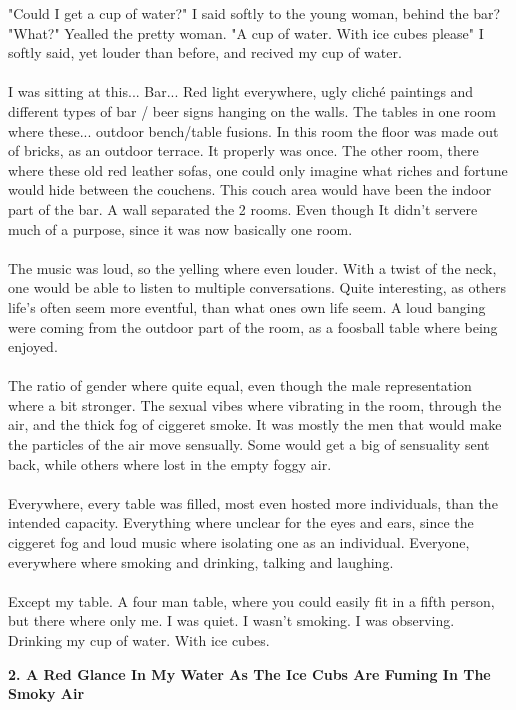 \documentclass[]{article}
\begin{document}
"Could I get a cup of water?" I said softly to the young woman, behind the bar?
"What?" Yealled the pretty woman.
"A cup of water. With ice cubes please" I softly said, yet louder than before, and recived my cup of water.
\\ \\
I was sitting at this... Bar... Red light everywhere, ugly cliché paintings and different types of bar / beer signs hanging on the walls. The tables in one room where these... outdoor bench/table fusions. In this room the floor was made out of bricks, as an outdoor terrace. It properly was once. The other room, there where these old red leather sofas, one could only imagine what riches and fortune would hide between the couchens. This couch area would have been the indoor part of the bar. A wall separated the 2 rooms. Even though It didn't  servere much of a purpose, since it was now basically one room.
\\ \\
The music was loud, so the yelling where even louder. With a twist of the neck, one would be able to listen to multiple conversations. Quite interesting, as others life's often seem more eventful, than what ones own life seem. A loud banging were coming from the outdoor part of the room, as a foosball table where being enjoyed. 
\\ \\
The ratio of gender where quite equal, even though the male representation where a bit stronger. The sexual vibes where vibrating in the room, through the air, and the thick fog of ciggeret smoke. It was mostly the men that would make the particles of the air move sensually. Some would get a big of sensuality sent back, while others where lost in the empty foggy air. 
\\ \\
Everywhere, every table was filled, most even hosted more individuals, than the intended capacity. Everything where unclear for the eyes and ears, since the ciggeret fog and loud music where isolating one as an individual. Everyone, everywhere where smoking and drinking, talking and laughing.
\\ \\
Except my table. A four man table, where you could easily fit in a fifth person, but there where only me. I was quiet. I wasn't smoking. I was observing. Drinking my cup of water. With ice cubes.

\newpage

\begin{center}
	\large\textbf{2. A Red Glance In My Water As \newline The Ice Cubs Are Fuming In The Smoky Air}
\end{center}
\end{document}
